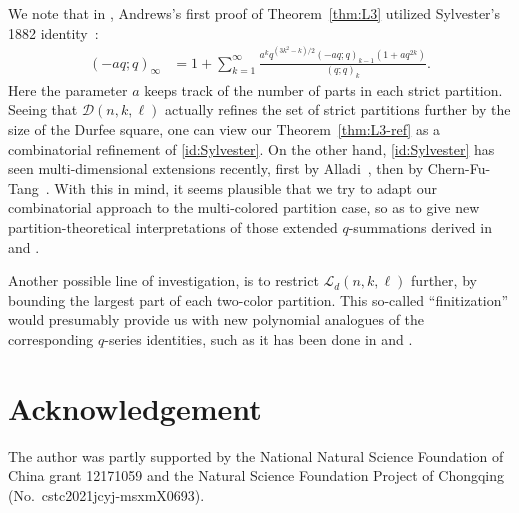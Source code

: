 \documentclass[11pt,reqno]{amsart}
\numberwithin{equation}{section}
\theoremstyle{plain}
\theoremstyle{definition}
\newcommand{\D}{\mathcal{D}}
\renewcommand{\L}{\mathcal{L}}
\begin{document}
We note that in \cite{and21}, Andrews's first proof of Theorem~\ref{thm:L3} utilized Sylvester's 1882 identity~\cite[Thm.~9.2]{andtp}:
\begin{align}\label{id:Sylvester}
(-aq;q)_{\infty} &= 1+\sum_{k=1}^{\infty}\frac{a^kq^{(3k^2-k)/2}(-aq;q)_{k-1}(1+aq^{2k})}{(q;q)_k}.
\end{align}
Here the parameter $a$ keeps track of the number of parts in each strict partition. Seeing that $\D(n,k,\ell)$ actually refines the set of strict partitions further by the size of the Durfee square, one can view our Theorem~\ref{thm:L3-ref} as a combinatorial refinement of \eqref{id:Sylvester}. On the other hand, \eqref{id:Sylvester} has seen multi-dimensional extensions recently, first by Alladi~\cite{ali17}, then by Chern-Fu-Tang~\cite{CFT}. With this in mind, it seems plausible that we try to adapt our combinatorial approach to the multi-colored partition case, so as to give new partition-theoretical interpretations of those extended $q$-summations derived in \cite{ali17} and \cite{CFT}.

Another possible line of investigation, is to restrict $\L_d(n,k,\ell)$ further, by bounding the largest part of each two-color partition. This so-called ``finitization'' would presumably provide us with new polynomial analogues of the corresponding $q$-series identities, such as it has been done in \cite{BU} and \cite{unc21}.


\section*{Acknowledgement}
The author was partly supported by the National Natural Science Foundation of China grant 12171059 and the Natural Science Foundation Project of Chongqing (No.~cstc2021jcyj-msxmX0693).
\end{document}
